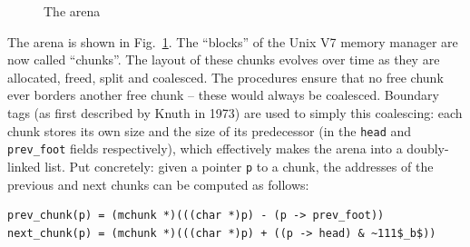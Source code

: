 \documentclass[12pt,a4paper]{article}
\theoremstyle{remark}
\begin{document}
\begin{figure}[tbhp]
\caption{The arena}
\label{fig:arena}
\end{figure}

The arena is shown in Fig.~\ref{fig:arena}. The ``blocks'' of the Unix V7 memory manager are now called ``chunks''. The layout of these chunks evolves over time as they are allocated, freed, split and coalesced. The procedures ensure that no free chunk ever borders another free chunk -- these would always be coalesced. Boundary tags (as first described by Knuth in 1973) are used to simply this
coalescing: each chunk stores its own size and the size of its predecessor (in the {\tt head} and {\tt prev\_foot} fields respectively), which effectively makes the arena into a doubly-linked list. Put concretely: given a pointer {\tt p} to a chunk, the addresses of the previous and next chunks can be computed as follows:
\begin{lstlisting}
prev_chunk(p) = (mchunk *)(((char *)p) - (p -> prev_foot))
next_chunk(p) = (mchunk *)(((char *)p) + ((p -> head) & ~111$_b$))
\end{lstlisting}
\end{document}
